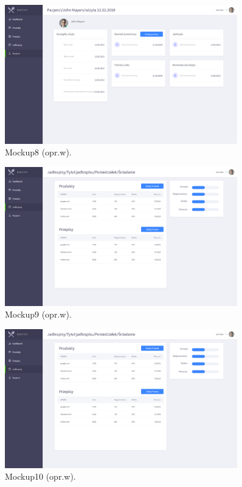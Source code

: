 \begin{minipage}{\textwidth}
    \begin{figure}[H]
        \centering\includegraphics[width=0.9\textwidth]{img/mockups/mockup8.png}
        \caption{Mockup8 (opr.w).}\label{rysunek:mockup8}
    \end{figure}
\end{minipage}

\begin{minipage}{\textwidth}
    \begin{figure}[H]
        \centering\includegraphics[width=0.9\textwidth]{img/mockups/mockup9.png}
        \caption{Mockup9 (opr.w).}\label{rysunek:mockup9}
    \end{figure}
\end{minipage}

\begin{minipage}{\textwidth}
    \begin{figure}[H]
        \centering\includegraphics[width=0.9\textwidth]{img/mockups/mockup10.png}
        \caption{Mockup10 (opr.w).}\label{rysunek:mockup10}
    \end{figure}
\end{minipage}

